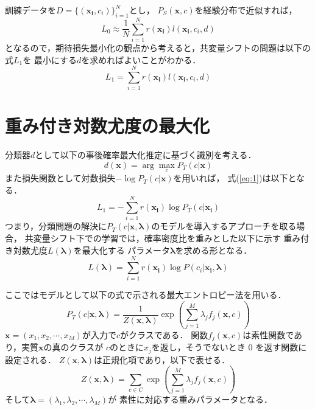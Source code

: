 \documentclass[japanese]{jnlp_1.4}
\begin{document}
訓練データを\( D = \{ (\boldsymbol{x_i},c_i) \}_{i = 1}^N \)とし，
\( P_S(\boldsymbol{x},c) \)を経験分布で近似すれば，
\[
 L_0 \approx  \frac{1}{N} \sum_{i=1}^N r(\boldsymbol{x_i}) l(\boldsymbol{x_i},c_i,d) 
\]
となるので，期待損失最小化の観点から考えると，共変量シフトの問題は以下の式\( L_1 \)を
最小にする\( d \)を求めればよいことがわかる．
\begin{equation}
L_1 = \sum_{i=1}^N r(\boldsymbol{x_i}) l(\boldsymbol{x_i},c_i,d) 
\label{eq:1}
\end{equation}


\section{重み付き対数尤度の最大化}


分類器\( d \)として以下の事後確率最大化推定に基づく識別を考える．
\[
d(\boldsymbol{x}) = \arg \max_{c} P_T(c|\boldsymbol{x})
\]
また損失関数として対数損失\( - \log P_T(c|\boldsymbol{x}) \)を用いれば，
\mbox{式(\ref{eq:1})}は以下となる．
\[
L_1 = - \sum_{i=1}^N r(\boldsymbol{x_i}) \log P_T(c|\boldsymbol{x_i}) 
\]
つまり，分類問題の解決に\( P_T(c|\boldsymbol{x},\boldsymbol{\lambda}) \)のモデルを導入するアプローチを取る場合，
共変量シフト下での学習では，確率密度比を重みとした以下に示す
重み付き対数尤度\( L(\boldsymbol{\lambda}) \)を最大化する
パラメータ\(\boldsymbol{\lambda}\)を求める形となる．
\begin{equation}
    L(\boldsymbol{\lambda}) = \sum_{i=1}^N r(\boldsymbol{x_i}) \log P(c_i|\boldsymbol{x_i},\boldsymbol{\lambda})        
     \label{eq:2}
\end{equation}

ここではモデルとして以下の式で示される最大エントロピー法を用いる．
\begin{equation}
P_T(c|\boldsymbol{x},\boldsymbol{\lambda}) = \frac{1}{Z(\boldsymbol{x},\boldsymbol{\lambda})} \exp \left(
\sum_{j=1}^M \lambda_j f_j(\boldsymbol{x},c)
\right)
     \label{eq:3}
\end{equation}
\( \boldsymbol{x} = (x_1,x_2,\cdots,x_M) \)が入力で\( c \)がクラスである．
関数\( f_j(\boldsymbol{x},c) \)は素性関数であり，実質\( \boldsymbol{x} \)の真のクラスが
\( c \)のときに\( x_j \)を返し，そうでないとき 0 を返す関数に設定される．
\( Z(\boldsymbol{x},\boldsymbol{\lambda}) \)は正規化項であり，以下で表せる．
\begin{equation}
  Z(\boldsymbol{x},\boldsymbol{\lambda}) = \sum_{c \in C} \exp \left(
\sum_{j=1}^M \lambda_j f_j(\boldsymbol{x},c) 
\right)
     \label{eq:4}
\end{equation}
\noindent
そして\( \boldsymbol{\lambda} = (\lambda_1,\lambda_2,\cdots,\lambda_M) \)が
素性に対応する重みパラメータとなる．
\end{document}
